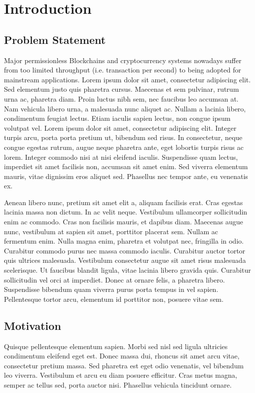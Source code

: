 \section{Introduction}
\subsection{Problem Statement}
Major permissionless Blockchains and cryptocurrency systems \cite{nakamoto2008bitcoin, buterin2014ethereum} nowadays suffer from too limited throughput (i.e. transaction per second) to being adopted for mainstream applications.
Lorem ipsum dolor sit amet, consectetur adipiscing elit. Sed elementum justo\cite{miller2017sprites} quis pharetra cursus. Maecenas et sem pulvinar, rutrum urna ac, pharetra diam. Proin luctus nibh sem, nec faucibus leo accumsan at. Nam vehicula libero urna, a malesuada nunc aliquet ac. Nullam a lacinia libero, condimentum feugiat lectus. Etiam iaculis sapien lectus, non congue ipsum volutpat vel. Lorem ipsum dolor sit amet, consectetur adipiscing elit. Integer turpis arcu, porta porta pretium ut, bibendum sed risus. In consectetur, neque congue egestas rutrum, augue neque pharetra ante, eget lobortis turpis risus ac lorem. Integer commodo nisi at nisi eleifend iaculis. Suspendisse quam lectus, imperdiet sit amet facilisis non, accumsan sit amet enim. Sed viverra elementum mauris, vitae dignissim eros aliquet sed. Phasellus nec tempor ante, eu venenatis ex.

Aenean libero nunc, pretium sit amet elit a, aliquam facilisis erat. Cras egestas lacinia massa non dictum. In ac velit neque. Vestibulum ullamcorper sollicitudin enim ac commodo. Cras non facilisis mauris, et dapibus diam. Maecenas augue nunc, vestibulum at sapien sit amet, porttitor placerat sem. Nullam ac fermentum enim. Nulla magna enim, pharetra et volutpat nec, fringilla in odio. Curabitur commodo purus nec massa commodo iaculis. Curabitur auctor tortor quis ultrices malesuada. Vestibulum consectetur augue sit amet risus malesuada scelerisque. Ut faucibus blandit ligula, vitae lacinia libero gravida quis. Curabitur sollicitudin vel orci at imperdiet. Donec at ornare felis, a pharetra libero. Suspendisse bibendum quam viverra purus porta tempus in vel sapien. Pellentesque tortor arcu, elementum id porttitor non, posuere vitae sem.
\subsection{Motivation}
Quisque pellentesque elementum sapien. Morbi sed nisl sed ligula ultricies condimentum eleifend eget est. Donec massa dui, rhoncus sit amet arcu vitae, consectetur pretium massa. Sed pharetra est eget odio venenatis, vel bibendum leo viverra. Vestibulum et arcu eu diam posuere efficitur. Cras metus magna, semper ac tellus sed, porta auctor nisi. Phasellus vehicula tincidunt ornare.

